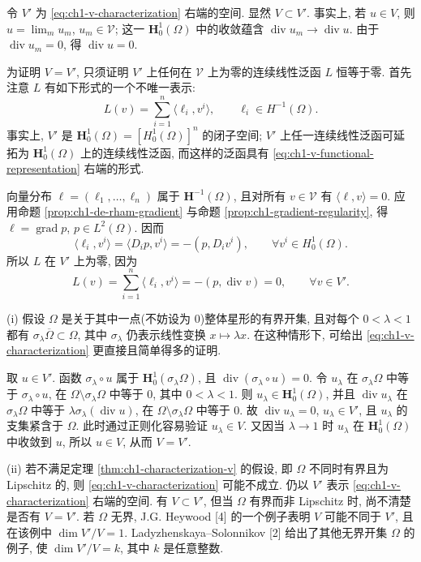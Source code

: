 \begin{Proof}
令 $V'$ 为 \eqref{eq:ch1-v-characterization} 右端的空间. 显然 $V\subset V'$. 事实上, 若 $u\in V$, 则 $u=\lim_m u_m$, $u_m\in\mathcal V$; 这一 $\mathbf H_0^1(\Omega)$ 中的收敛蕴含 $\operatorname{div}u_m\to\operatorname{div}u$. 由于 $\operatorname{div}u_m=0$, 得 $\operatorname{div}u=0$.

为证明 $V=V'$, 只须证明 $V'$ 上任何在 $\mathcal V$ 上为零的连续线性泛函 $L$ 恒等于零. 首先注意 $L$ 有如下形式的一个不唯一表示:
\begin{equation}
L(v)=\sum_{i=1}^n\langle\ell_i,v^i\rangle,
\qquad\ell_i\in H^{-1}(\Omega).
\label{eq:ch1-v-functional-representation}
\end{equation}
事实上, $V'$ 是 $\mathbf H_0^1(\Omega)=[H_0^1(\Omega)]^n$ 的闭子空间; $V'$ 上任一连续线性泛函可延拓为 $\mathbf H_0^1(\Omega)$ 上的连续线性泛函, 而这样的泛函具有 \eqref{eq:ch1-v-functional-representation} 右端的形式.

向量分布 $\ell=(\ell_1,\ldots,\ell_n)$ 属于 $\mathbf H^{-1}(\Omega)$, 且对所有 $v\in\mathcal V$ 有 $\langle\ell,v\rangle=0$. 应用命题 \ref{prop:ch1-de-rham-gradient} 与命题 \ref{prop:ch1-gradient-regularity}, 得 $\ell=\operatorname{grad}p$, $p\in L^2(\Omega)$. 因而
\[
\langle\ell_i,v^i\rangle=\langle D_i p,v^i\rangle=-(p,D_i v^i),
\qquad\forall v^i\in H_0^1(\Omega).
\]
所以 $L$ 在 $V'$ 上为零, 因为
\[
L(v)=\sum_{i=1}^n\langle\ell_i,v^i\rangle
=-(p,\operatorname{div}v)=0,
\qquad\forall v\in V'.
\]
\end{Proof}

\begin{Remark}
\label{rem:ch1-v-star-shaped}
(i) 假设 $\Omega$ 是关于其中一点(不妨设为 $0$)整体星形的有界开集, 且对每个 $0<\lambda<1$ 都有 $\sigma_\lambda\overline\Omega\subset\Omega$, 其中 $\sigma_\lambda$ 仍表示线性变换 $x\mapsto\lambda x$. 在这种情形下, 可给出 \eqref{eq:ch1-v-characterization} 更直接且简单得多的证明.

取 $u\in V'$. 函数 $\sigma_\lambda\circ u$ 属于 $\mathbf H_0^1(\sigma_\lambda\Omega)$, 且 $\operatorname{div}(\sigma_\lambda\circ u)=0$. 令 $u_\lambda$ 在 $\sigma_\lambda\Omega$ 中等于 $\sigma_\lambda\circ u$, 在 $\Omega\setminus\sigma_\lambda\Omega$ 中等于 $0$, 其中 $0<\lambda<1$. 则 $u_\lambda\in\mathbf H_0^1(\Omega)$, 并且 $\operatorname{div}u_\lambda$ 在 $\sigma_\lambda\Omega$ 中等于 $\lambda\sigma_\lambda(\operatorname{div}u)$, 在 $\Omega\setminus\sigma_\lambda\Omega$ 中等于 $0$. 故 $\operatorname{div}u_\lambda=0$, $u_\lambda\in V'$, 且 $u_\lambda$ 的支集紧含于 $\Omega$. 此时通过正则化容易验证 $u_\lambda\in V$. 又因当 $\lambda\to1$ 时 $u_\lambda$ 在 $\mathbf H_0^1(\Omega)$ 中收敛到 $u$, 所以 $u\in V$, 从而 $V=V'$.

(ii) 若不满足定理 \ref{thm:ch1-characterization-v} 的假设, 即 $\Omega$ 不同时有界且为 Lipschitz 的, 则 \eqref{eq:ch1-v-characterization} 可能不成立. 仍以 $V'$ 表示 \eqref{eq:ch1-v-characterization} 右端的空间. 有 $V\subset V'$, 但当 $\Omega$ 有界而非 Lipschitz 时, 尚不清楚是否有 $V=V'$. 若 $\Omega$ 无界, J.G. Heywood [4] 的一个例子表明 $V$ 可能不同于 $V'$, 且在该例中 $\dim V'/V=1$. Ladyzhenskaya--Solonnikov [2] 给出了其他无界开集 $\Omega$ 的例子, 使 $\dim V'/V=k$, 其中 $k$ 是任意整数.
\end{Remark}

